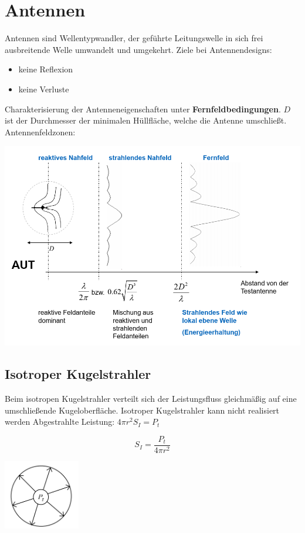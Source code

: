 \documentclass[english]{latex4ei/latex4ei_sheet}
\begin{document}
\section{Antennen}
\begin{sectionbox}
Antennen sind Wellentypwandler, der geführte Leitungswelle in sich frei ausbreitende Welle umwandelt und umgekehrt.
Ziele bei Antennendesigns:
\begin{itemize}
	\item keine Reflexion
	\item keine Verluste
\end{itemize}
Charakterisierung der Antenneneigenschaften unter \textbf{Fernfeldbedingungen}.
$D$ ist der Durchmesser der minimalen Hüllfläche, welche die Antenne umschließt.
Antennenfeldzonen:
\begin{center}\includegraphics[width = \textwidth]{./img/antennen_feldzonen.png}
\end{center}
\subsection{Isotroper Kugelstrahler}
Beim isotropen Kugelstrahler verteilt sich der Leistungsfluss gleichmäßig auf eine umschließende Kugeloberfläche.
Isotroper Kugelstrahler kann nicht realisiert werden 
Abgestrahlte Leistung: $4\pi r^2 S_I = P_t$

$$S_I = \frac{P_t}{4\pi r^2}$$

\begin{center}\includegraphics[width = 0.25\textwidth]{./img/antennen_isotroper_strahler.png}
\end{center}

\end{sectionbox}
\end{document}
